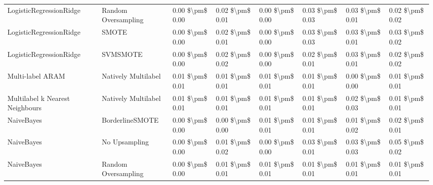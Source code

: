\begin{tabular}{llllllll}
        LogisticRegressionRidge &           Random Oversampling & 0.00 \$\textbackslash pm\$ 0.00 &           0.02 \$\textbackslash pm\$ 0.01 &       0.00 \$\textbackslash pm\$ 0.00 &        0.03 \$\textbackslash pm\$ 0.03 &                         0.03 \$\textbackslash pm\$ 0.01 & 0.02 \$\textbackslash pm\$ 0.02 \\
        LogisticRegressionRidge &                         SMOTE & 0.00 \$\textbackslash pm\$ 0.00 &           0.02 \$\textbackslash pm\$ 0.01 &       0.00 \$\textbackslash pm\$ 0.00 &        0.03 \$\textbackslash pm\$ 0.03 &                         0.03 \$\textbackslash pm\$ 0.01 & 0.03 \$\textbackslash pm\$ 0.02 \\
        LogisticRegressionRidge &                      SVMSMOTE & 0.00 \$\textbackslash pm\$ 0.00 &           0.02 \$\textbackslash pm\$ 0.02 &       0.00 \$\textbackslash pm\$ 0.00 &        0.02 \$\textbackslash pm\$ 0.01 &                         0.03 \$\textbackslash pm\$ 0.01 & 0.02 \$\textbackslash pm\$ 0.02 \\
               Multi-label ARAM &           Natively Multilabel & 0.01 \$\textbackslash pm\$ 0.01 &           0.01 \$\textbackslash pm\$ 0.01 &       0.01 \$\textbackslash pm\$ 0.01 &        0.01 \$\textbackslash pm\$ 0.01 &                         0.00 \$\textbackslash pm\$ 0.00 & 0.01 \$\textbackslash pm\$ 0.01 \\
Multilabel k Nearest Neighbours &           Natively Multilabel & 0.01 \$\textbackslash pm\$ 0.01 &           0.01 \$\textbackslash pm\$ 0.01 &       0.01 \$\textbackslash pm\$ 0.01 &        0.01 \$\textbackslash pm\$ 0.01 &                         0.02 \$\textbackslash pm\$ 0.03 & 0.01 \$\textbackslash pm\$ 0.01 \\
                     NaiveBayes &               BorderlineSMOTE & 0.00 \$\textbackslash pm\$ 0.00 &           0.00 \$\textbackslash pm\$ 0.00 &       0.01 \$\textbackslash pm\$ 0.01 &        0.01 \$\textbackslash pm\$ 0.01 &                         0.01 \$\textbackslash pm\$ 0.02 & 0.02 \$\textbackslash pm\$ 0.01 \\
                     NaiveBayes &                 No Upsampling & 0.00 \$\textbackslash pm\$ 0.00 &           0.01 \$\textbackslash pm\$ 0.02 &       0.00 \$\textbackslash pm\$ 0.00 &        0.03 \$\textbackslash pm\$ 0.01 &                         0.03 \$\textbackslash pm\$ 0.03 & 0.05 \$\textbackslash pm\$ 0.02 \\
                     NaiveBayes &           Random Oversampling & 0.00 \$\textbackslash pm\$ 0.00 &           0.01 \$\textbackslash pm\$ 0.01 &       0.01 \$\textbackslash pm\$ 0.01 &        0.01 \$\textbackslash pm\$ 0.01 &                         0.01 \$\textbackslash pm\$ 0.01 & 0.01 \$\textbackslash pm\$ 0.01 \\

\end{tabular}
